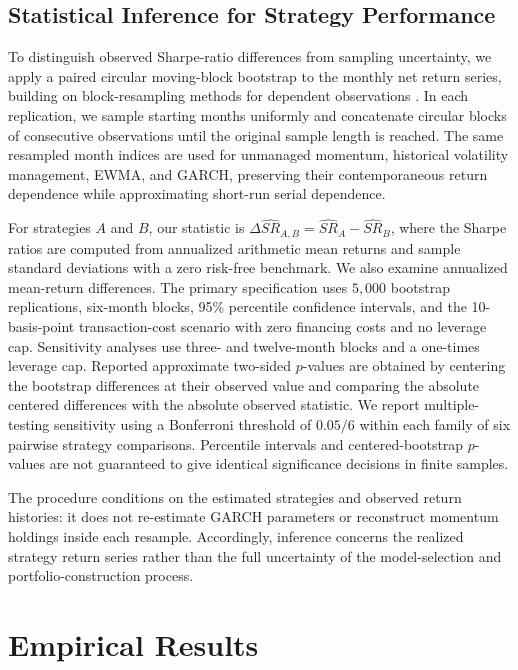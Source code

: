 \documentclass[11pt]{article}
\begin{document}
\subsection{Statistical Inference for Strategy Performance}
\label{sec:bootstrap_method}
To distinguish observed Sharpe-ratio differences from sampling uncertainty, we apply a paired circular moving-block bootstrap to the monthly net return series, building on block-resampling methods for dependent observations \citep{kunsch1989jackknife}. In each replication, we sample starting months uniformly and concatenate circular blocks of consecutive observations until the original sample length is reached. The same resampled month indices are used for unmanaged momentum, historical volatility management, EWMA, and GARCH, preserving their contemporaneous return dependence while approximating short-run serial dependence.

For strategies $A$ and $B$, our statistic is $\Delta\widehat{SR}_{A,B}=\widehat{SR}_A-\widehat{SR}_B$, where the Sharpe ratios are computed from annualized arithmetic mean returns and sample standard deviations with a zero risk-free benchmark. We also examine annualized mean-return differences. The primary specification uses $5{,}000$ bootstrap replications, six-month blocks, 95\% percentile confidence intervals, and the 10-basis-point transaction-cost scenario with zero financing costs and no leverage cap. Sensitivity analyses use three- and twelve-month blocks and a one-times leverage cap. Reported approximate two-sided $p$-values are obtained by centering the bootstrap differences at their observed value and comparing the absolute centered differences with the absolute observed statistic. We report multiple-testing sensitivity using a Bonferroni threshold of $0.05/6$ within each family of six pairwise strategy comparisons. Percentile intervals and centered-bootstrap $p$-values are not guaranteed to give identical significance decisions in finite samples.

The procedure conditions on the estimated strategies and observed return histories: it does not re-estimate GARCH parameters or reconstruct momentum holdings inside each resample. Accordingly, inference concerns the realized strategy return series rather than the full uncertainty of the model-selection and portfolio-construction process.



\section{Empirical Results}
\label{sec:results}
\end{document}
